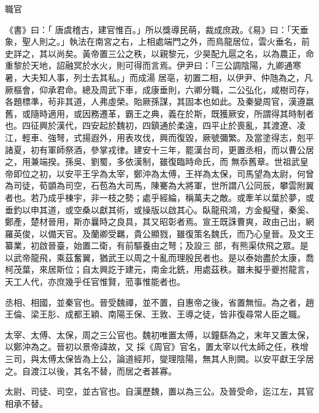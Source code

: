 
\begin{pinyinscope}

 職官



 《書》曰：「
 唐虞稽古，建官惟百。」所以獎導民萌，裁成庶政。《易》曰：「天垂象，聖人則之。」執法在南宮之右，上相處端門之外，而鳥龍居位，雲火垂名，前史詳之，其以尚矣。黃帝置三公之秩，以親黎元，少昊配九扈之名，以為農正，命重黎於天地，詔融冥於水火，則可得而言焉。伊尹曰：「三公調陰陽，九卿通寒暑，大夫知人事，列士去其私。」而成湯
 居亳，初置二相，以伊尹、仲虺為之，凡厥樞會，仰承君命。總及周武下車，成康垂則，六卿分職，二公弘化，咸樹司存，各題標準，茍非其道，人弗虛榮。貽厥孫謀，其固本也如此。及秦變周官，漢遵嬴舊，或隨時適用，或因務遷革，霸王之典，義在於斯，既獲厥安，所謂得其時制者也。四征興於漢代，四安起於魏初，四鎮通於柔遠，四平止於喪亂，其渡遼、凌江，輕車、強弩，式揚遐外，用表攻伐，興而復毀，厥號彌繁。及當塗得志，剋平諸夏，初有軍師祭酒，參掌戎律。建安十三年，罷漢台司，更置丞相，而以曹公居之，用兼端揆。孫吳、劉蜀，多依漢制，雖復臨時命氏，而
 無忝舊章。世祖武皇帝即位之初，以安平王孚為太宰，鄭沖為太傅，王祥為太保，司馬望為太尉，何曾為司徒，荀顗為司空，石苞為大司馬，陳騫為大將軍，世所謂八公同辰，攀雲附翼者也。若乃成乎棟宇，非一枝之勢；處乎經綸，稱萬夫之敵。或牽羊以葉於夢，或垂釣以申其道，或空桑以獻其術，或操版以啟其心。臥龍飛鴻，方金擬璧，秦奚、鄭產，楚材晉用，斯亦曩時之良具，其又昭彰者焉。宣王既誅曹爽，政由己出，網羅英俊，以備天官。及蘭卿受羈，貴公顯戮，雖復策名魏氏，而乃心皇晉。及文王纂業，初啟晉臺，始置二衛，有前驅養由之弩；及設三
 部，有熊渠佽飛之眾。是以武帝龍飛，乘茲奮翼，猶武王以周之十亂而理殷民者也。是以泰始盡於太康，喬柯茂葉，來居斯位；自太興訖于建元，南金北銑，用處茲秩。雖未擬乎夔拊龍言，天工人代，亦庶幾乎任官惟賢，蒞事惟能者也。



 丞相、相國，並秦官也。晉受魏禪，並不置，自惠帝之後，省置無恒。為之者，趙王倫、梁王肜、成都王穎、南陽王保、王敦、王導之徒，皆非復尋常人臣之職。



 太宰、太傅、太保，周之三公官也。魏初唯置太傅，以鐘繇為之，末年又置太保，以鄭沖為之。晉初以景帝諱故，又
 採《周官》官名，置太宰以代太師之任，秩增三司，與太傅太保皆為上公，論道經邦，燮理陰陽，無其人則闕。以安平獻王孚居之。自渡江以後，其名不替，而居之者甚寡。



 太尉、司徒、司空，並古官也。自漢歷魏，置以為三公。及晉受命，迄江左，其官相承不替。




\end{pinyinscope}
